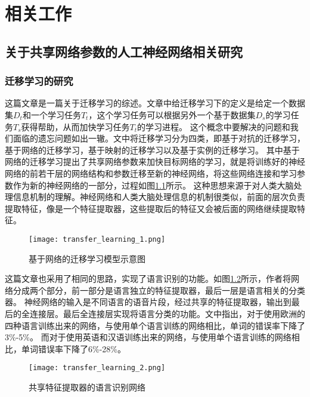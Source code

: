 
\chapter{相关工作}

\section{关于共享网络参数的人工神经网络相关研究}
\subsection{迁移学习的研究}

这篇文章\cite{10.1007/978-3-030-01424-7_27}是一篇关于迁移学习的综述。文章中给迁移学习下的定义是给定一个数据集$D_t$和一个学习任务$T_t$，这个学习任务可以根据另外一个基于数据集$D_s$的学习任务$T_s$获得帮助，从而加快学习任务$T_t$的学习进程。
这个概念中要解决的问题和我们面临的遗忘问题如出一辙。文中将迁移学习分为四类，即基于对抗的迁移学习，基于网络的迁移学习，基于映射的迁移学习以及基于实例的迁移学习。
其中基于网络的迁移学习提出了共享网络参数来加快目标网络的学习，就是将训练好的神经网络的前若干层的网络结构和参数迁移至新的神经网络，将这些网络连接和学习参数作为新的神经网络的一部分，过程如图\ref{fig:transfer_learning_1}所示。
这种思想来源于对人类大脑处理信息机制的理解。神经网络和人类大脑处理信息的机制很类似，前面的层次负责提取特征，像是一个特征提取器，这些提取后的特征又会被后面的网络继续提取特征。
\begin{figure}
    \centering
    \texttt{[image: transfer\_learning\_1.png]}
    \caption{基于网络的迁移学习模型示意图\cite{10.1007/978-3-030-01424-7_27}}
    \label{fig:transfer_learning_1}
\end{figure}

这篇文章\cite{6639081}也采用了相同的思路，实现了语言识别的功能。如图\ref{fig:transfer_learning_2}所示，作者将网络分成两个部分，前一部分是语言独立的特征提取器，最后一层是语言相关的分类器。
神经网络的输入是不同语言的语音片段，经过共享的特征提取器，输出到最后的全连接层。最后全连接层实现将语言分类的功能。文中指出，对于使用欧洲的四种语言训练出来的网络，与使用单个语言训练的网络相比，单词的错误率下降了3\%-5\%。
而对于使用英语和汉语训练出来的网络，与使用单个语言训练的网络相比，单词错误率下降了6\%-28\%。
\begin{figure}
    \centering
    \texttt{[image: transfer\_learning\_2.png]}
    \caption{共享特征提取器的语言识别网络\cite{6639081}}
    \label{fig:transfer_learning_2}
\end{figure}

